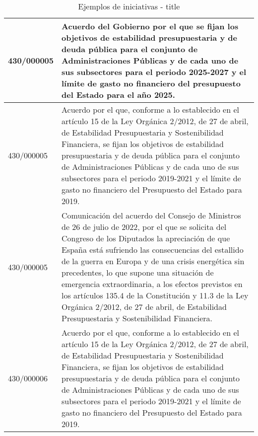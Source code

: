 {\begin{table}[H]
\begin{center}
\begin{tabularx}{\linewidth}{| l | X |}
\hline
430/000005 & Acuerdo del Gobierno por el que se fijan los objetivos de estabilidad presupuestaria y de deuda pública para el conjunto de Administraciones Públicas y de cada uno de sus subsectores para el periodo 2025-2027 y el límite de gasto no financiero del presupuesto del Estado para el año 2025. \\
\hline
430/000005 & Acuerdo por el que, conforme a lo establecido en el artículo 15 de la Ley Orgánica 2/2012, de 27 de abril, de Estabilidad Presupuestaria y Sostenibilidad Financiera, se fijan los objetivos de estabilidad presupuestaria y de deuda pública para el conjunto de Administraciones Públicas y de cada uno de sus subsectores para el periodo 2019-2021 y el límite de gasto no financiero del Presupuesto del Estado para 2019. \\
\hline
430/000005 & Comunicación del acuerdo del Consejo de Ministros de 26 de julio de 2022, por el que se solicita del Congreso de los Diputados la apreciación de que España está sufriendo las consecuencias del estallido de la guerra en Europa y de una crisis energética sin precedentes, lo que supone una situación de emergencia extraordinaria, a los efectos previstos en los artículos 135.4 de la Constitución y 11.3 de la Ley Orgánica 2/2012, de 27 de abril, de Estabilidad Presupuestaria y Sostenibilidad Financiera. \\
\hline
430/000006 & Acuerdo por el que, conforme a lo establecido en el artículo 15 de la Ley Orgánica 2/2012, de 27 de abril, de Estabilidad Presupuestaria y Sostenibilidad Financiera, se fijan los objetivos de estabilidad presupuestaria y de deuda pública para el conjunto de Administraciones Públicas y de cada uno de sus subsectores para el periodo 2019-2021 y el límite de gasto no financiero del Presupuesto del Estado para 2019. \\
\hline
\end{tabularx}
\end{center}
\caption{Ejemplos de iniciativas - title}
\label{tab:title}
\end{table}
}


